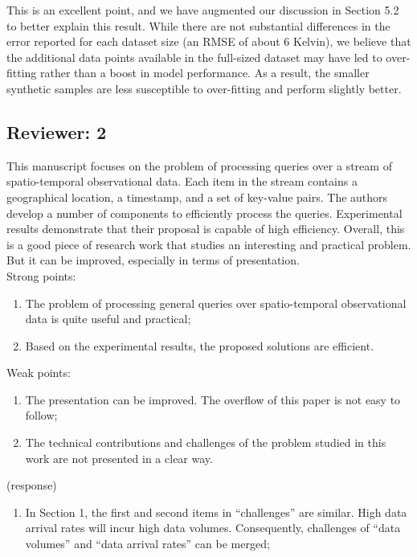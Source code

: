 \documentclass{article}
\begin{document}
\begin{tcolorbox}
This is an excellent point, and we have augmented our discussion in
Section 5.2 to better explain this result. While there are not
substantial differences in the error reported for each dataset size (an
RMSE of about 6 Kelvin), we believe that the additional data points
available in the full-sized dataset may have led to over-fitting rather
than a boost in model performance. As a result, the smaller synthetic
samples are less susceptible to over-fitting and perform slightly
better.
\end{tcolorbox}

\subsection*{Reviewer: 2}\label{reviewer-2}
This manuscript focuses on the problem of processing queries over a stream of spatio-temporal observational data. Each item in the stream contains a geographical location, a timestamp, and a set of key-value pairs. The authors develop a number of components to efficiently process the queries. Experimental results demonstrate that their proposal is capable of high efficiency. Overall, this is a good piece of research work that studies an interesting and practical problem. But it can be improved, especially in terms of presentation. \\
%
Strong points:
\begin{enumerate}
    \item The problem of processing general queries over spatio-temporal observational data is quite useful and practical;
    \item Based on the experimental results, the proposed solutions are efficient.
\end{enumerate}
%
Weak points:
\begin{enumerate}
    \item The presentation can be improved. The overflow of this paper is not easy to follow;
    \item The technical contributions and challenges of the problem studied in this work are not presented in a clear way.
\end{enumerate}

\begin{tcolorbox}
(response)
\end{tcolorbox}

\begin{enumerate}
\def\labelenumi{(\arabic{enumi})}
\item
  In Section 1, the first and second items in ``challenges'' are
  similar. High data arrival rates will incur high data volumes.
  Consequently, challenges of ``data volumes'' and ``data arrival
  rates'' can be merged;
\end{enumerate}
\end{document}
